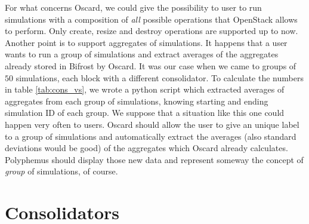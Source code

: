 For what concerns Oscard, we could give the possibility to user to run simulations with a composition of \emph{all} possible operations that OpenStack allows to perform. Only create, resize and destroy operations are supported up to now. Another point is to support aggregates of simulations. It happens that a user wants to run a group of simulations and extract averages of the aggregates already stored in Bifrost by Oscard. It was our case when we came to groups of $50$ simulations, each block with a different consolidator. To calculate the numbers in table \ref{tab:cons_vs}, we wrote a python script which extracted averages of aggregates from each group of simulations, knowing starting and ending simulation ID of each group. We suppose that a situation like this one could happen very often to users. Oscard should allow the user to give an unique label to a group of simulations and automatically extract the averages (also standard deviations would be good) of the aggregates which Oscard already calculates. Polyphemus should display those new data and represent someway the concept of \emph{group} of simulations, of course.

\section{Consolidators}
\label{sec:conc_cons}